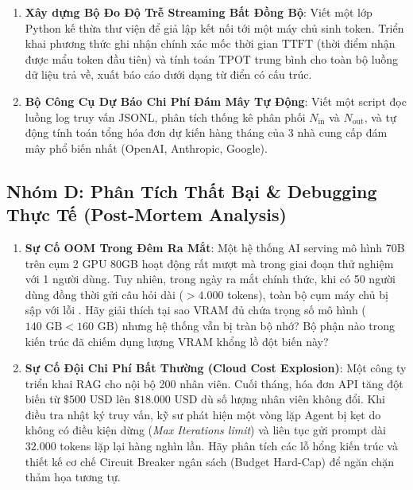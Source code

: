 \begin{enumerate}[label=\textbf{C\arabic*.}]
  \item \textbf{Xây dựng Bộ Đo Độ Trễ Streaming Bất Đồng Bộ}: Viết một lớp Python kế thừa thư viện  để giả lập kết nối tới một máy chủ sinh token. Triển khai phương thức ghi nhận chính xác mốc thời gian $\text{TTFT}$ (thời điểm nhận được mẩu token đầu tiên) và tính toán $\text{TPOT}$ trung bình cho toàn bộ luồng dữ liệu trả về, xuất báo cáo dưới dạng từ điển có cấu trúc.
  \item \textbf{Bộ Công Cụ Dự Báo Chi Phí Đám Mây Tự Động}: Viết một script đọc luồng log truy vấn JSONL, phân tích thống kê phân phối $N_{\text{in}}$ và $N_{\text{out}}$, và tự động tính toán tổng hóa đơn dự kiến hàng tháng của 3 nhà cung cấp đám mây phổ biến nhất (OpenAI, Anthropic, Google).
\end{enumerate}

\subsection{Nhóm D: Phân Tích Thất Bại \& Debugging Thực Tế (Post-Mortem Analysis)}

\begin{enumerate}[label=\textbf{D\arabic*.}]
  \item \textbf{Sự Cố OOM Trong Đêm Ra Mắt}: Một hệ thống AI serving mô hình 70B trên cụm 2 GPU 80GB hoạt động rất mượt mà trong giai đoạn thử nghiệm với 1 người dùng. Tuy nhiên, trong ngày ra mắt chính thức, khi có 50 người dùng đồng thời gửi câu hỏi dài ($> 4.000$ tokens), toàn bộ cụm máy chủ bị sập với lỗi . Hãy giải thích tại sao VRAM đủ chứa trọng số mô hình ($140\text{ GB} < 160\text{ GB}$) nhưng hệ thống vẫn bị tràn bộ nhớ? Bộ phận nào trong kiến trúc đã chiếm dụng lượng VRAM khổng lồ đột biến này?
  \item \textbf{Sự Cố Đội Chi Phí Bất Thường (Cloud Cost Explosion)}: Một công ty triển khai RAG cho nội bộ 200 nhân viên. Cuối tháng, hóa đơn API tăng đột biến từ $\$500\text{ USD}$ lên $\$18.000\text{ USD}$ dù số lượng nhân viên không đổi. Khi điều tra nhật ký truy vấn, kỹ sư phát hiện một vòng lặp Agent bị kẹt do không có điều kiện dừng (\textit{Max Iterations limit}) và liên tục gửi prompt dài $32.000$ tokens lặp lại hàng nghìn lần. Hãy phân tích các lỗ hổng kiến trúc và thiết kế cơ chế Circuit Breaker ngân sách (Budget Hard-Cap) để ngăn chặn thảm họa tương tự.
\end{enumerate}

